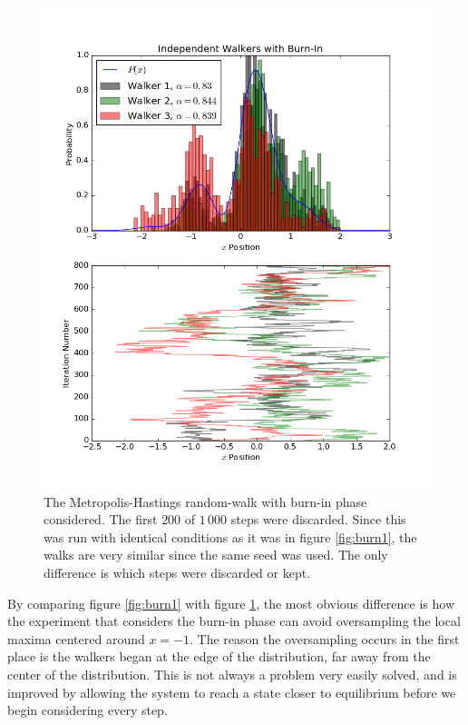 \begin{figure}
  \centering
  \includegraphics[width=\linewidth]{burn2.png}
  \caption{
    The Metropolis-Hastings random-walk with burn-in phase considered. The first
    $200$ of $1\,000$ steps were discarded. Since this was run with identical
    conditions as it was in figure \ref{fig:burn1}, the walks are very similar
    since the same seed was used. The only difference is which steps were
    discarded or kept.
  }
  \label{fig:burn2}
\end{figure}

By comparing figure \ref{fig:burn1} with figure \ref{fig:burn2}, the most
obvious difference is how the experiment that considers the burn-in phase can
avoid oversampling the local maxima centered around $x = -1$. The reason the
oversampling occurs in the first place is the walkers began at the edge of the
distribution, far away from the center of the distribution. This is not always a
problem very easily solved, and is improved by allowing the system to reach a
state closer to equilibrium before we begin considering every step.

